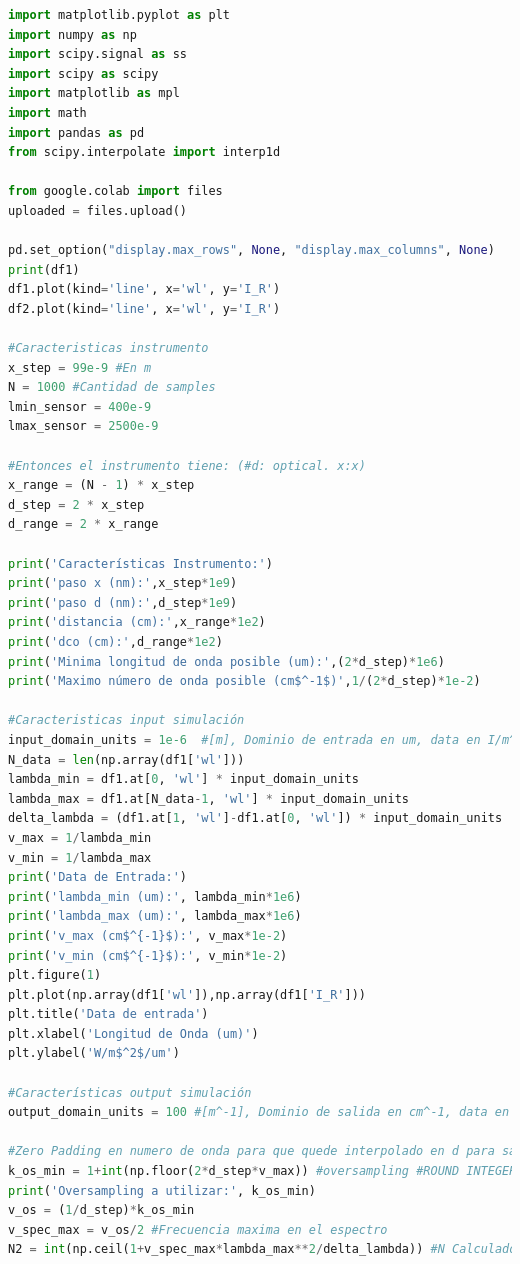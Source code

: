 \documentclass[11pt,titlepage]{article}
\begin{document}
\begin{lstlisting}[language=Python, caption=Python example]
import matplotlib.pyplot as plt
import numpy as np
import scipy.signal as ss
import scipy as scipy
import matplotlib as mpl
import math
import pandas as pd
from scipy.interpolate import interp1d

from google.colab import files
uploaded = files.upload()

pd.set_option("display.max_rows", None, "display.max_columns", None)
print(df1)
df1.plot(kind='line', x='wl', y='I_R')
df2.plot(kind='line', x='wl', y='I_R')

#Caracteristicas instrumento
x_step = 99e-9 #En m
N = 1000 #Cantidad de samples
lmin_sensor = 400e-9
lmax_sensor = 2500e-9

#Entonces el instrumento tiene: (#d: optical. x:x)
x_range = (N - 1) * x_step
d_step = 2 * x_step 
d_range = 2 * x_range

print('Características Instrumento:')
print('paso x (nm):',x_step*1e9)
print('paso d (nm):',d_step*1e9)
print('distancia (cm):',x_range*1e2)
print('dco (cm):',d_range*1e2)
print('Minima longitud de onda posible (um):',(2*d_step)*1e6)
print('Maximo número de onda posible (cm$^-1$)',1/(2*d_step)*1e-2)

#Caracteristicas input simulación
input_domain_units = 1e-6  #[m], Dominio de entrada en um, data en I/m^2/[um]
N_data = len(np.array(df1['wl']))
lambda_min = df1.at[0, 'wl'] * input_domain_units
lambda_max = df1.at[N_data-1, 'wl'] * input_domain_units
delta_lambda = (df1.at[1, 'wl']-df1.at[0, 'wl']) * input_domain_units
v_max = 1/lambda_min
v_min = 1/lambda_max
print('Data de Entrada:')
print('lambda_min (um):', lambda_min*1e6)
print('lambda_max (um):', lambda_max*1e6)
print('v_max (cm$^{-1}$):', v_max*1e-2)
print('v_min (cm$^{-1}$):', v_min*1e-2)
plt.figure(1)
plt.plot(np.array(df1['wl']),np.array(df1['I_R']))
plt.title('Data de entrada')
plt.xlabel('Longitud de Onda (um)')
plt.ylabel('W/m$^2$/um')

#Características output simulación
output_domain_units = 100 #[m^-1], Dominio de salida en cm^-1, data en W/m^2/[cm^-1]

#Zero Padding en numero de onda para que quede interpolado en d para sampling k*d_step para algun valor de k
k_os_min = 1+int(np.floor(2*d_step*v_max)) #oversampling #ROUND INTEGER TO NEXT INTEGER
print('Oversampling a utilizar:', k_os_min)
v_os = (1/d_step)*k_os_min
v_spec_max = v_os/2 #Frecuencia maxima en el espectro
N2 = int(np.ceil(1+v_spec_max*lambda_max**2/delta_lambda)) #N Calculado con criterio de conservar resolución minima


\end{lstlisting}
\end{document}
